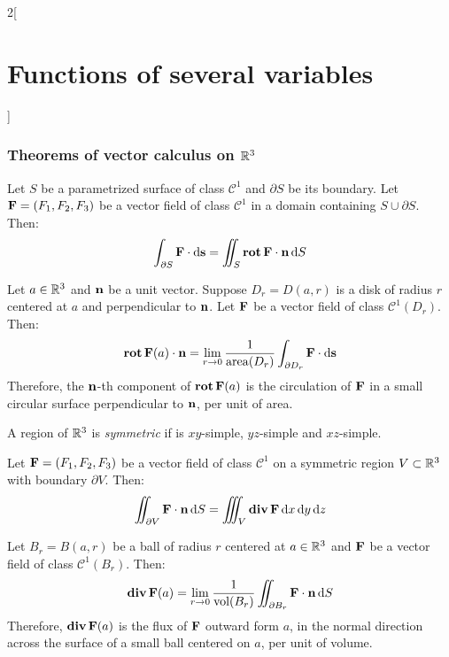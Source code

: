 \documentclass[../../../main_math.tex]{subfiles}
\begin{document}
\begin{multicols}{2}[\section{Functions of several variables}]
  \subsubsection{Theorems of vector calculus on \texorpdfstring{$\mathbb{R}^3$}{R3}}
  \begin{theorem}
    Let $S$ be a parametrized surface of class $\mathcal{C}^1$ and $\partial S$ be its boundary. Let $\boldsymbol{\mathrm{F}}=(F_1,F_2,F_3)$ be a vector field of class $\mathcal{C}^1$ in a domain containing $S\cup\partial S$. Then: $$\int_{\partial S}\boldsymbol{\mathrm{F}}\cdot \dd{\boldsymbol{\mathrm{s}}}=\iint_S\operatorname{\boldsymbol{\mathrm{rot}}}\boldsymbol{\mathrm{F}}\cdot\boldsymbol{\mathrm{n}} \dd{S}$$
  \end{theorem}
  \begin{corollary}
    Let $a\in\mathbb{R}^3$ and $\boldsymbol{\mathrm{n}}$ be a unit vector. Suppose $D_r=D(a,r)$ is a disk of radius $r$ centered at $a$ and perpendicular to $\boldsymbol{\mathrm{n}}$. Let $\boldsymbol{\mathrm{F}}$ be a vector field of class $\mathcal{C}^1(D_r)$. Then: $$\operatorname{\boldsymbol{\mathrm{rot}}}\boldsymbol{\mathrm{F}}(a)\cdot\boldsymbol{\mathrm{n}}=\lim_{r\to 0}\frac{1}{\operatorname{area}(D_r)}\int_{\partial D_r}\boldsymbol{\mathrm{F}}\cdot \dd{\boldsymbol{\mathrm{s}}}$$ Therefore, the $\boldsymbol{\mathrm{n}}$-th component of $\operatorname{\boldsymbol{\mathrm{rot}}}\boldsymbol{\mathrm{F}}(a)$ is the circulation of $\boldsymbol{\mathrm{F}}$ in a small circular surface perpendicular to $\boldsymbol{\mathrm{n}}$, per unit of area.
  \end{corollary}
  \begin{definition}
    A region of $\mathbb{R}^3$ is \emph{symmetric} if is $xy$-simple, $yz$-simple and $xz$-simple.
  \end{definition}
  \begin{theorem}\label{FSV_divergencethm}
    Let $\boldsymbol{\mathrm{F}}=(F_1,F_2,F_3)$ be a vector field of class $\mathcal{C}^1$ on a symmetric region $V\subset\mathbb{R}^3$ with boundary $\partial V$. Then: $$\iint_{\partial V}\boldsymbol{\mathrm{F}}\cdot\boldsymbol{\mathrm{n}} \dd{S}=\iiint_V\operatorname{\boldsymbol{\mathrm{div}}}\boldsymbol{\mathrm{F}}\dd{x}\dd{y}\dd{z}$$
  \end{theorem}
  \begin{corollary}
    Let $B_r=B(a,r)$ be a ball of radius $r$ centered at $a\in\mathbb{R}^3$ and $\boldsymbol{\mathrm{F}}$ be a vector field of class $\mathcal{C}^1(B_r)$. Then: $$\operatorname{\boldsymbol{\mathrm{div}}}\boldsymbol{\mathrm{F}}(a)=\lim_{r\to 0}\frac{1}{\text{vol}(B_r)}\iint_{\partial B_r}\boldsymbol{\mathrm{F}}\cdot\boldsymbol{\mathrm{n}} \dd{S}$$ Therefore, $\operatorname{\boldsymbol{\mathrm{div}}}\boldsymbol{\mathrm{F}}(a)$ is the flux of $\boldsymbol{\mathrm{F}}$ outward form $a$, in the normal direction across the surface of a small ball centered on $a$, per unit of volume.
  \end{corollary}
\end{multicols}
\end{document}
